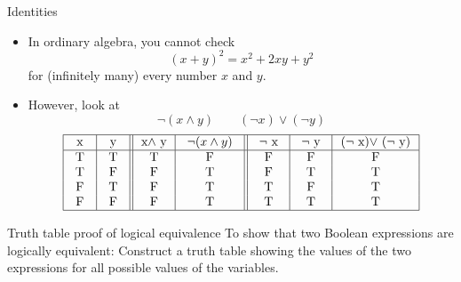 \documentclass{beamer}
\begin{document}
\begin{frame}{Identities}
\begin{itemize}
\item In ordinary algebra, you cannot check
\[
(x+y)^2=x^2+2xy+y^2
\]
for (infinitely many) every number $x$ and $y$.\pause
\item However, look at\vspace{-0.2cm}
\[
\neg(x\wedge y)\qquad (\neg x)\vee (\neg y)
\]
\[
\begin{tabular}{| >{\centering\arraybackslash}b{0.2in} | >{\centering\arraybackslash}b{0.2in} || >{\centering\arraybackslash}b{0.3in}| >{\centering\arraybackslash}b{0.6in}|| >{\centering\arraybackslash}b{0.3in} |>{\centering\arraybackslash}b{0.3in}|>{\centering\arraybackslash}b{0.8in}|}
\hline
x& y &x$\wedge$ y& $\neg(x\wedge y)$& $\neg$ x& $\neg$ y & ($\neg$ x)$\vee$ ($\neg$ y)\\
\hline
T & T& T & F&F&F&F\\
T & F& F& T&F&T&T\\
F & T & F& T&T&F&T\\
F & F & F& T&T&T&T\\
\hline
\end{tabular}
\]
\end{itemize}
\pause
{}
\end{frame}

\begin{frame}[t]
\begin{block}{Truth table proof of logical equivalence}
To show that two Boolean expressions are logically equivalent: Construct a truth table showing the values of the two expressions for all possible values of the variables.
\end{block}



\end{frame}
\end{document}
